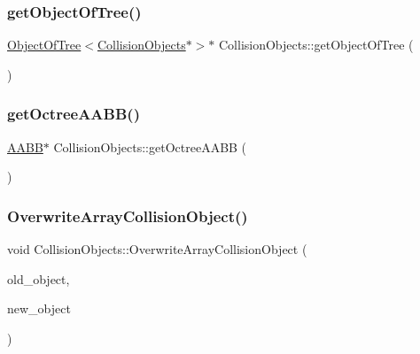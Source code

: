 \subsubsection{\texorpdfstring{get\+Object\+Of\+Tree()}{getObjectOfTree()}}
{\footnotesize\ttfamily \mbox{\hyperlink{class_object_of_tree}{Object\+Of\+Tree}}$<$\mbox{\hyperlink{class_collision_objects}{Collision\+Objects}}$\ast$$>$$\ast$ Collision\+Objects\+::get\+Object\+Of\+Tree (\begin{DoxyParamCaption}{ }\end{DoxyParamCaption})\hspace{0.3cm}{\ttfamily [inline]}}

\mbox{\label{class_collision_objects_aee138e1c28f7f3dcbdce56181d59b628}} 
\subsubsection{\texorpdfstring{get\+Octree\+A\+A\+B\+B()}{getOctreeAABB()}}
{\footnotesize\ttfamily \mbox{\hyperlink{class_a_a_b_b}{A\+A\+BB}}$\ast$ Collision\+Objects\+::get\+Octree\+A\+A\+BB (\begin{DoxyParamCaption}{ }\end{DoxyParamCaption})\hspace{0.3cm}{\ttfamily [inline]}}

\mbox{\label{class_collision_objects_aed8d6903485ae775d8bbff511796a653}} 
\subsubsection{\texorpdfstring{Overwrite\+Array\+Collision\+Object()}{OverwriteArrayCollisionObject()}}
{\footnotesize\ttfamily void Collision\+Objects\+::\+Overwrite\+Array\+Collision\+Object (\begin{DoxyParamCaption}\item[{\mbox{\hyperlink{class_collision_object}{Collision\+Object}} $\ast$}]{old\+\_\+object,  }\item[{\mbox{\hyperlink{class_collision_object}{Collision\+Object}} $\ast$}]{new\+\_\+object }\end{DoxyParamCaption})\hspace{0.3cm}{\ttfamily [inline]}}



